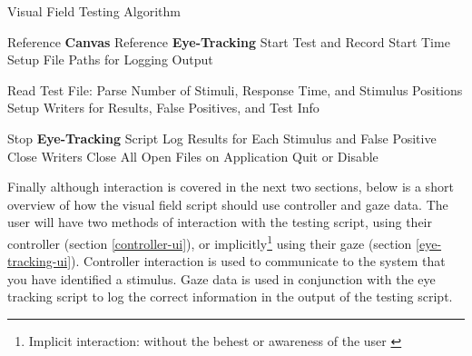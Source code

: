 \documentclass{l4proj}
\begin{document}
\begin{algorithm}[h!]
\caption{Visual Field Testing Algorithm}
\label{alg:visual_field_testing}


Reference \textbf{Canvas}\;
Reference \textbf{Eye-Tracking}\;
Start Test and Record Start Time\;
Setup File Paths for Logging Output\;

Read Test File: Parse Number of Stimuli, Response Time, and Stimulus Positions\;
Setup Writers for Results, False Positives, and Test Info\;


Stop \textbf{Eye-Tracking} Script\;
Log Results for Each Stimulus and False Positive\;
Close Writers\;
Close All Open Files on Application Quit or Disable\;

\end{algorithm}



Finally although interaction is covered in the next two sections, below is a short overview of how the visual field script should use controller and gaze data. The user will have two methods of interaction with the testing script, using their controller (section \ref{controller-ui}), or implicitly\footnote{Implicit interaction: without the behest or awareness of the user \citep{JuLeifer2006ImplicitInteractions}} using their gaze (section \ref{eye-tracking-ui}). Controller interaction is used to communicate to the system that you have identified a stimulus. Gaze data is used in conjunction with the eye tracking script to log the correct information in the output of the testing script.
\end{document}
